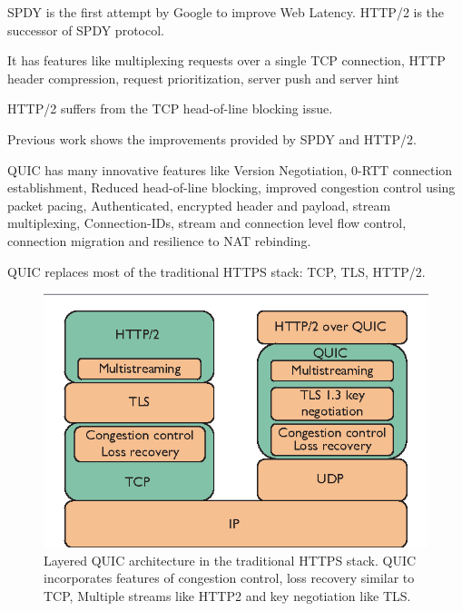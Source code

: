 \begin{frame}
SPDY is the first attempt by Google to improve Web Latency.\cite{spdy} HTTP/2 is the successor of SPDY protocol.

It has features like multiplexing requests over a single TCP connection, HTTP header compression, request prioritization, server push and server hint\cite{rfc7540}

HTTP/2 suffers from the TCP head-of-line blocking issue.

Previous work \cite{DBLP:conf/networking/El-khatibTW14}\cite{7745823}\cite{DBLP:conf/sac/CarlucciCM15}\cite{DBLP:conf/icc/MegyesiKM16} shows the improvements provided by SPDY and HTTP/2.  

    QUIC has many innovative features like Version Negotiation, 0-RTT connection establishment, Reduced head-of-line blocking, improved congestion control using packet pacing, Authenticated, encrypted header and payload, stream multiplexing, Connection-IDs, stream and connection level flow control, connection migration and resilience to NAT rebinding.\cite{ietf-quic-transport-18}

\end{frame}
\clearpage

\begin{frame}
QUIC replaces most of the traditional HTTPS stack: TCP, TLS, HTTP/2.
\begin{figure}[!t]
    \centering
    \includegraphics[width=1\textwidth]
    {figures/QUICstack.png}
    \endminipage\hfill
    \caption{\label{fig:QUIC_architecture}Layered QUIC architecture in the traditional HTTPS stack. QUIC incorporates features of congestion control, loss recovery similar to TCP, Multiple streams like HTTP2 and key negotiation like TLS.\cite{Cui2017}}
    
\end{figure}
\end{frame}
\clearpage

